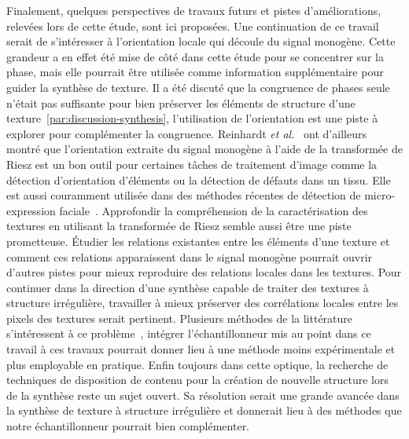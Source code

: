 \bigskip

Finalement, quelques perspectives de travaux futurs et pistes d'améliorations, relevées lors de cette étude, sont ici proposées. Une continuation de ce travail serait de s'intéresser à l'orientation locale qui découle du signal monogène. Cette grandeur a en effet été mise de côté dans cette étude pour se concentrer sur la phase, mais elle pourrait être utilisée comme information supplémentaire pour guider la synthèse de texture. Il a été discuté que la congruence de phases seule n'était pas suffisante pour bien préserver les éléments de structure d'une texture~\ref{par:discussion-synthesis}, l'utilisation de l'orientation est une piste à explorer pour complémenter la congruence. Reinhardt \textit{et al.}~\cite{reinhardt_multi-scale_2022} ont d'ailleurs montré que l'orientation extraite du signal monogène à l'aide de la transformée de Riesz est un bon outil pour certaines tâches de traitement d'image comme la détection d'orientation d'éléments ou la détection de défauts dans un tissu. Elle est aussi couramment utilisée dans des méthodes récentes de détection de micro-expression faciale~\cite{duque_mean_2020}. Approfondir la compréhension de la caractérisation des textures en utilisant la transformée de Riesz semble aussi être une piste prometteuse. Étudier les relations existantes entre les éléments d'une texture et comment ces relations apparaissent dans le signal monogène pourrait ouvrir d'autres pistes pour mieux reproduire des relations locales dans les textures. Pour continuer dans la direction d'une synthèse capable de traiter des textures à structure irrégulière, travailler à mieux préserver des corrélations locales entre les pixels des textures serait pertinent. Plusieurs méthodes de la littérature s'intéressent à ce problème~\cite{cavalier_local_2019, heitz_high-performance_2018}, intégrer l'échantillonneur mis au point dans ce travail à ces travaux pourrait donner lieu à une méthode moins expérimentale et plus employable en pratique. Enfin toujours dans cette optique, la recherche de techniques de disposition de contenu pour la création de nouvelle structure lors de la synthèse reste un sujet ouvert. Sa résolution serait une grande avancée dans la synthèse de texture à structure irrégulière et donnerait lieu à des méthodes que notre échantillonneur pourrait bien complémenter.